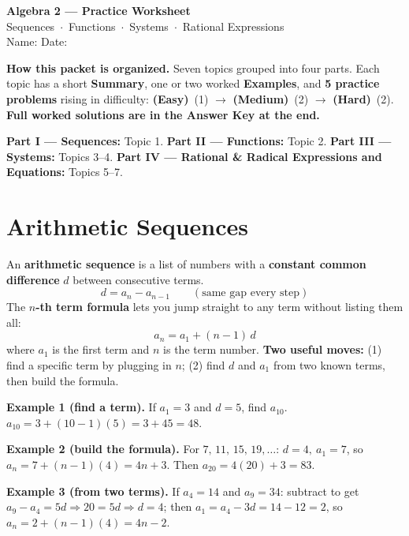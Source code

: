 \documentclass[11pt]{article}
\newcommand{\easy}{{\small\color{FangGreen}\textbf{(Easy)}}}
\newcommand{\med}{{\small\color{FangOrange}\textbf{(Medium)}}}
\newcommand{\hard}{{\small\color{FangAccent}\textbf{(Hard)}}}
\begin{document}
\begin{center}
  {\color{FangBlue}\Huge\bfseries Algebra 2 --- Practice Worksheet}\\[3pt]
  {\color{RuleGray}\large Sequences \,$\cdot$\, Functions \,$\cdot$\, Systems \,$\cdot$\, Rational Expressions}\\[6pt]
  {\small\color{RuleGray}Name: \underline{\hspace{5cm}} \qquad Date: \underline{\hspace{3.5cm}}}
\end{center}
\vspace{2pt}

\begin{summary}
\textbf{How this packet is organized.} Seven topics grouped into four parts.
Each topic has a short \textbf{Summary}, one or two worked \textbf{Examples}, and \textbf{5 practice
problems} rising in difficulty: \easy\ (1) $\rightarrow$ \med\ (2) $\rightarrow$ \hard\ (2).
\textbf{Full worked solutions are in the Answer Key at the end.}

\smallskip
\textbf{Part I --- Sequences:} Topic 1. \quad
\textbf{Part II --- Functions:} Topic 2. \quad
\textbf{Part III --- Systems:} Topics 3--4. \quad
\textbf{Part IV --- Rational \& Radical Expressions and Equations:} Topics 5--7.
\end{summary}

\section{Arithmetic Sequences}

\begin{summary}
An \textbf{arithmetic sequence} is a list of numbers with a \textbf{constant common difference} $d$
between consecutive terms.
\[
d = a_n - a_{n-1}\qquad(\text{same gap every step})
\]
The \textbf{$n$-th term formula} lets you jump straight to any term without listing them all:
\[
\boxed{\,a_n = a_1 + (n-1)\,d\,}
\]
where $a_1$ is the first term and $n$ is the term number.
\textbf{Two useful moves:} (1) find a specific term by plugging in $n$;
(2) find $d$ and $a_1$ from two known terms, then build the formula.
\end{summary}

\begin{example}
\textbf{Example 1 (find a term).} If $a_1 = 3$ and $d = 5$, find $a_{10}$.\\
$a_{10} = 3 + (10-1)(5) = 3 + 45 = 48.$

\smallskip
\textbf{Example 2 (build the formula).} For $7,\,11,\,15,\,19,\dots$:
$d = 4,\ a_1 = 7$, so $a_n = 7 + (n-1)(4) = 4n + 3$. Then $a_{20} = 4(20)+3 = 83.$

\smallskip
\textbf{Example 3 (from two terms).} If $a_4 = 14$ and $a_9 = 34$:
subtract to get $a_9 - a_4 = 5d \Rightarrow 20 = 5d \Rightarrow d = 4$;
then $a_1 = a_4 - 3d = 14 - 12 = 2$, so $a_n = 2 + (n-1)(4)=4n-2.$
\end{example}
\end{document}
